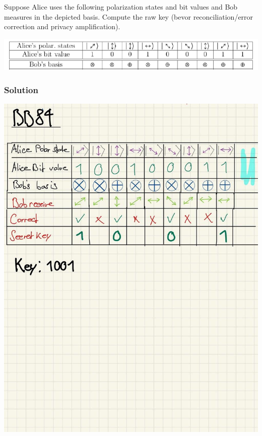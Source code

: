 \documentclass[11pt]{article}
\begin{document}
Suppose Alice uses the following polarization states and bit values and
Bob measures in the depicted basis. Compute the raw key (bevor
reconciliation/error correction and privacy amplification).

\begin{center}
	\includegraphics[scale=0.9]{img/ex02.png}
\end{center}

\hypertarget{solution}{%
\subsubsection{Solution}\label{solution}}

\begin{center}
	\includegraphics[scale=0.8]{img/bb84_1.jpg}
\end{center}
\end{document}
